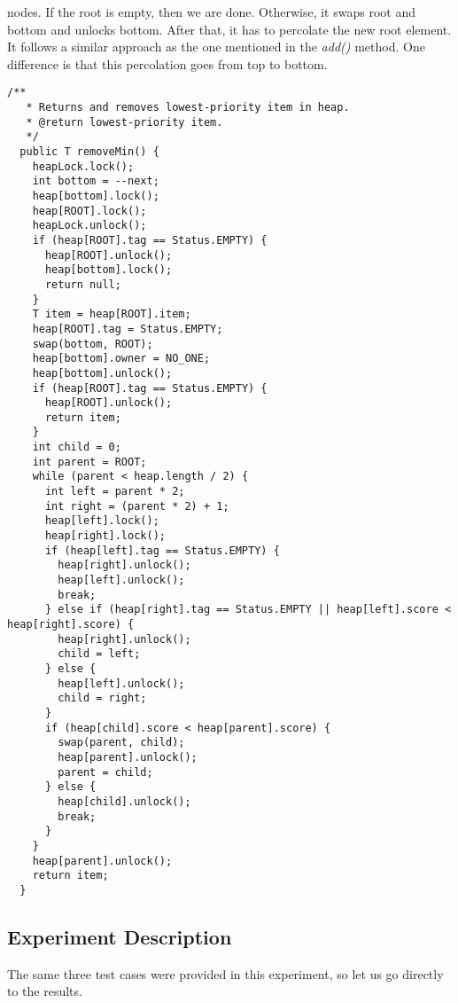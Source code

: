 nodes. If the root is empty, then we are done. Otherwise, it swaps root and
bottom and unlocks bottom. After that, it has to percolate the new root
element. It follows a similar approach as the one mentioned in the
\textit{add()} method. One difference is that this percolation goes from top to
bottom.
\par
\hfill
\begin{lstlisting}[style=numbers]
  /**
   * Returns and removes lowest-priority item in heap.
   * @return lowest-priority item.
   */
  public T removeMin() {
    heapLock.lock();
    int bottom = --next;
    heap[bottom].lock();
    heap[ROOT].lock();
    heapLock.unlock();
    if (heap[ROOT].tag == Status.EMPTY) {
      heap[ROOT].unlock();
      heap[bottom].lock();
      return null;
    }
    T item = heap[ROOT].item;
    heap[ROOT].tag = Status.EMPTY;
    swap(bottom, ROOT);
    heap[bottom].owner = NO_ONE;
    heap[bottom].unlock();
    if (heap[ROOT].tag == Status.EMPTY) {
      heap[ROOT].unlock();
      return item;
    }
    int child = 0;
    int parent = ROOT;
    while (parent < heap.length / 2) {
      int left = parent * 2;
      int right = (parent * 2) + 1;
      heap[left].lock();
      heap[right].lock();
      if (heap[left].tag == Status.EMPTY) {
        heap[right].unlock();
        heap[left].unlock();
        break;
      } else if (heap[right].tag == Status.EMPTY || heap[left].score < heap[right].score) {
        heap[right].unlock();
        child = left;
      } else {
        heap[left].unlock();
        child = right;
      }
      if (heap[child].score < heap[parent].score) {
        swap(parent, child);
        heap[parent].unlock();
        parent = child;
      } else {
        heap[child].unlock();
        break;
      }
    }
    heap[parent].unlock();
    return item;
  }
\end{lstlisting}
\hfill
\par
\subsection{Experiment Description}
\par
The same three test cases were provided in this experiment, so let us go
directly to the results.
\par
